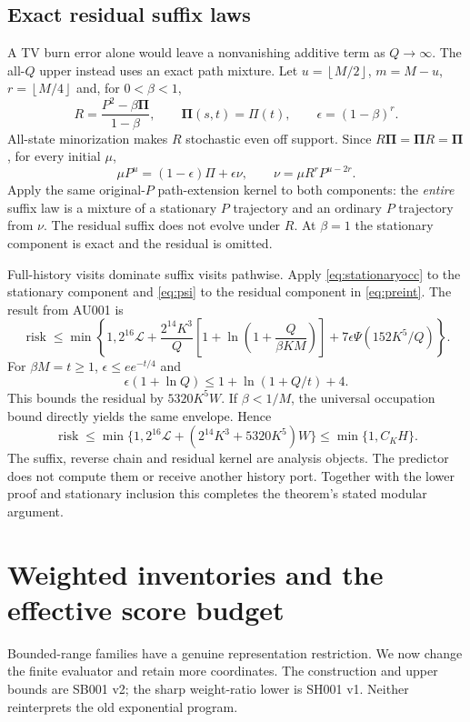 \documentclass[11pt,letterpaper]{article}
\theoremstyle{definition}\newtheorem{definition}[theorem]{Definition}
\theoremstyle{remark}\newtheorem{remark}[theorem]{Remark}
\newcommand{\floor}[1]{\left\lfloor #1\right\rfloor}
\newcommand{\unit}[1]{\textsf{#1}}
\begin{document}
\subsection{Exact residual suffix laws}
A TV burn error alone would leave a nonvanishing additive term as $Q\to\infty$. The all-$Q$ upper instead uses an exact path mixture. Let $u=\floor{M/2}$, $m=M-u$, $r=\floor{M/4}$ and, for $0<\beta<1$,
\[
 R=\frac{P^2-\beta\mathbf\Pi}{1-\beta},\qquad
 \mathbf\Pi(s,t)=\Pi(t),\qquad \epsilon=(1-\beta)^r.
\]
All-state minorization makes $R$ stochastic even off support. Since $R\mathbf\Pi=\mathbf\Pi R=\mathbf\Pi$, for every initial $\mu$,
\begin{equation}\label{eq:mixture}
 \mu P^u=(1-\epsilon)\Pi+\epsilon\nu,
 \qquad \nu=\mu R^rP^{u-2r}.
\end{equation}
Apply the same original-$P$ path-extension kernel to both components: the \emph{entire} suffix law is a mixture of a stationary $P$ trajectory and an ordinary $P$ trajectory from $\nu$. The residual suffix does not evolve under $R$. At $\beta=1$ the stationary component is exact and the residual is omitted.

Full-history visits dominate suffix visits pathwise. Apply \eqref{eq:stationaryocc} to the stationary component and \eqref{eq:psi} to the residual component in \eqref{eq:preint}. The result from \unit{AU001} is
\[
 \operatorname{risk}\le\min\left\{1,2^{16}\mathcal L+
 \frac{2^{14}K^3}{Q}\left[1+\ln\left(1+\frac Q{\beta KM}\right)\right]
 +7\epsilon\Psi(152K^5/Q)\right\}.
\]
For $\beta M=t\ge1$, $\epsilon\le e e^{-t/4}$ and
\[
 \epsilon(1+\ln Q)\le1+\ln(1+Q/t)+4.
\]
This bounds the residual by $5320K^5W$. If $\beta<1/M$, the universal occupation bound directly yields the same envelope. Hence
\[
 \operatorname{risk}\le\min\{1,2^{16}\mathcal L+(2^{14}K^3+5320K^5)W\}
 \le\min\{1,C_KH\}.
\]
The suffix, reverse chain and residual kernel are analysis objects. The predictor does not compute them or receive another history port. Together with the lower proof and stationary inclusion this completes the theorem's stated modular argument.

\section{Weighted inventories and the effective score budget}\label{sec:score}
Bounded-range families have a genuine representation restriction. We now change the finite evaluator and retain more coordinates. The construction and upper bounds are \unit{SB001 v2}; the sharp weight-ratio lower is \unit{SH001 v1}. Neither reinterprets the old exponential program.
\end{document}
